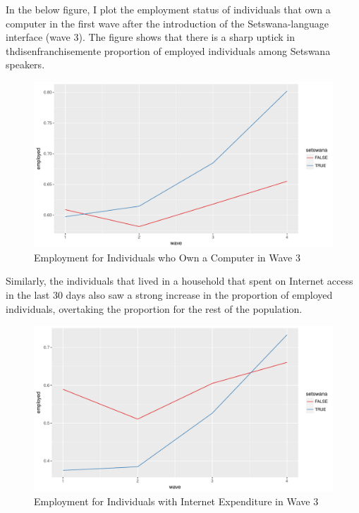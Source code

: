 \documentclass[a4paper,british]{article}\usepackage[]{graphicx}\usepackage[]{color}
\makeatletter
\def\maxwidth{ %
  \ifdim\Gin@nat@width>\linewidth
    \linewidth
  \else
    \Gin@nat@width
  \fi
}
\newenvironment{knitrout}{}{} %
\makeatother
\begin{document}
In the below figure, I plot the employment status of individuals that
own a computer in the first wave after the introduction of the Setswana-language
interface (wave 3). The figure shows that there is a sharp uptick
in thdisenfranchisemente proportion of employed individuals among
Setswana speakers. 

\begin{figure}[H]
\caption{Employment for Individuals who Own a Computer in Wave 3}

\begin{knitrout}
\color{fgcolor}
\includegraphics[width=\maxwidth]{../misc/latex-employment_own_computer-1} 

\end{knitrout}
\end{figure}

Similarly, the individuals that lived in a household that spent on
Internet access in the last 30 days also saw a strong increase in
the proportion of employed individuals, overtaking the proportion
for the rest of the population.

\begin{figure}[H]
\caption{Employment for Individuals with Internet Expenditure in Wave 3}

\begin{knitrout}
\color{fgcolor}
\includegraphics[width=\maxwidth]{../misc/latex-employment_int_exp-1} 

\end{knitrout}
\end{figure}
\end{document}
